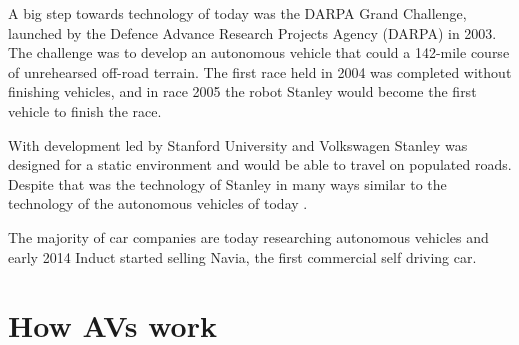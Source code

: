 \documentclass[11pt]{article}
\begin{document}
A big step towards technology of today was the DARPA Grand Challenge, launched by the Defence Advance Research Projects Agency (DARPA) in 2003. The challenge was to develop an autonomous vehicle that could a 142-mile course of unrehearsed off-road terrain. The first race held in 2004 was completed without finishing vehicles, and in race 2005 the robot Stanley would become the first vehicle to finish the race.

With development led by Stanford University and Volkswagen Stanley was designed for a static environment and would be able to travel on populated roads. Despite that was the technology of Stanley in many ways similar to the technology of the autonomous vehicles of today \cite{Thrun2006stanley}.

The majority of car companies are today researching autonomous vehicles and early 2014 Induct started selling Navia, the first commercial self driving car. %


\section{How AVs work}
\end{document}
